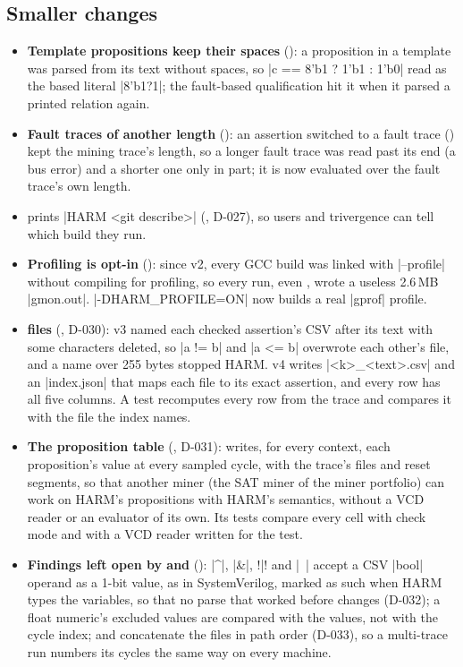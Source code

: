 \subsection{Smaller changes}\label{sec:smaller}
\begin{itemize}
\item \textbf{Template propositions keep their spaces} (): a proposition in a template was parsed from its text without spaces, so \code|c == 8'b1 ? 1'b1 : 1'b0| read as the based literal \code|8'b1?1|; the fault-based qualification hit it when it parsed a printed relation again.
\item \textbf{Fault traces of another length} (): an assertion switched to a fault trace () kept the mining trace's length, so a longer fault trace was read past its end (a bus error) and a shorter one only in part; it is now evaluated over the fault trace's own length.
\item \textbf{} prints \code|HARM <git describe>| (, D-027), so users and trivergence can tell which build they run.
\item \textbf{Profiling is opt-in} (): since v2, every GCC build was linked with \code|--profile| without compiling for profiling, so every run, even , wrote a useless 2.6\,MB \code|gmon.out|. \code|-DHARM_PROFILE=ON| now builds a real \code|gprof| profile.
\item \textbf{ files} (, D-030): v3 named each checked assertion's CSV after its text with some characters deleted, so \code|a != b| and \code|a <= b| overwrote each other's file, and a name over 255 bytes stopped HARM. v4 writes \code|<k>_<text>.csv| and an \code|index.json| that maps each file to its exact assertion, and every row has all five columns. A test recomputes every row from the trace and compares it with the file the index names.
\item \textbf{The proposition table} (, D-031):  writes, for every context, each proposition's value at every sampled cycle, with the trace's files and reset segments, so that another miner (the SAT miner of the miner portfolio) can work on HARM's propositions with HARM's semantics, without a VCD reader or an evaluator of its own. Its tests compare every cell with check mode and with a VCD reader written for the test.
\item \textbf{Findings left open by  and } (): \code|^|, \code|&|, \code!|! and \code|~| accept a CSV \code|bool| operand as a 1-bit value, as in SystemVerilog, marked as such when HARM types the variables, so that no parse that worked before changes (D-032); a float numeric's excluded values are compared with the values, not with the cycle index;  and  concatenate the files in path order (D-033), so a multi-trace run numbers its cycles the same way on every machine.

\end{itemize}
